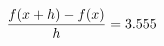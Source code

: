 \documentclass[preview]{standalone}
\begin{document}
\begin{align*}
\special{dvisvgm:raw <g id='unique000'>}\frac{f(x+h)-f(x)}{h} = 3.555\special{dvisvgm:raw </g>}
\end{align*}
\end{document}
